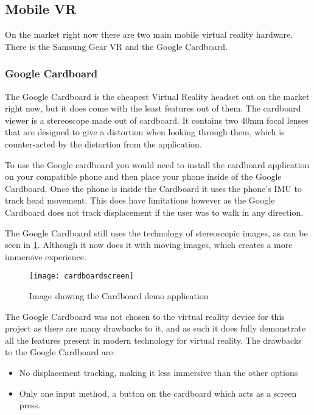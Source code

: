 \subsection{Mobile VR}
On the market right now there are two main mobile virtual reality hardware. There is the Samsung Gear VR and the Google Cardboard.

\subsubsection{Google Cardboard}
The Google Cardboard is the cheapest Virtual Reality headset out on the market right now, but it does come with the least features out of them. The cardboard viewer is a stereoscope made out of cardboard. It contains two 40mm focal lenses that are designed to give a distortion when looking through them, which is counter-acted by the distortion from the application\cite{cardboarddev}.
\newline
\par
To use the Google cardboard you would need to install the cardboard application on your compatible phone and then place your phone inside of the Google Cardboard. Once the phone is inside the Cardboard it uses the phone's IMU to track head movement. This does have limitations however as the Google Cardboard does not track displacement if the user was to walk in any direction.
\newline
\par
The Google Cardboard still uses the technology of stereoscopic images, as can be seen in \ref{fig:cardboard1}. Although it now does it with moving images, which creates a more immersive experience. \\

\begin{figure}[h]
	\texttt{[image: cardboardscreen]}
	\centering
	\caption{Image showing the Cardboard demo application}
	\label{fig:cardboard1}
\end{figure}

The Google Cardboard was not chosen to the virtual reality device for this project as there are many drawbacks to it, and as such it does fully demonstrate all the features present in modern technology for virtual reality. The drawbacks to the Google Cardboard are:

\begin{itemize}
	\item No displacement tracking, making it less immersive than the other options
	\item Only one input method, a button on the cardboard which acts as a screen press.
\end{itemize}

